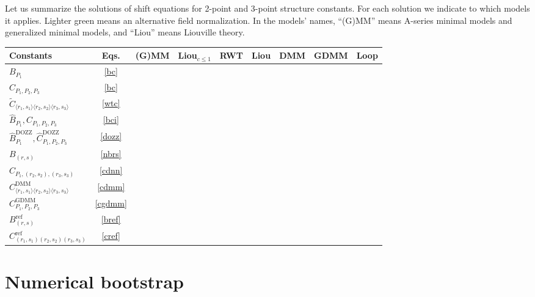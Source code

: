 \documentclass[12pt, a4paper]{article}
\begin{document}
Let us summarize the solutions of shift equations for 2-point and 3-point structure constants. For each solution we indicate to which models it applies. Lighter green means an alternative field normalization. In the models' names, ``(G)MM'' means A-series minimal models and generalized minimal models, and ``Liou'' means Liouville theory. 
\begin{center}
\begin{tabular}{|l|c|c|c|c|c|c|c|c|}
\hline 
 Constants & Eqs. & (G)MM & Liou$_{c\leq 1}$ & RWT & Liou & DMM & GDMM & Loop 
 \\
 \hline
  $B_{P_1}$ & \eqref{bc} & \cellcolor{green} & \cellcolor{green} & \cellcolor{green} &  & \cellcolor{green} & \cellcolor{green} & \cellcolor{green} 
  \\
  \hline 
  $C_{P_1,P_2,P_3}$& \eqref{bc} & \cellcolor{green} & \cellcolor{green} & \cellcolor{green} &  &  &  & \cellcolor{green} 
  \\
  \hline 
  $\widetilde{C}_{\langle r_1,s_1\rangle\langle r_2,s_2\rangle\langle r_3,s_3\rangle}$ & \eqref{wtc} & \cellcolor{green!20} & & & & & & 
  \\
  \hline 
  $\hat{B}_{P_1},\hat{C}_{P_1,P_2,P_3}$ &  \eqref{bci} & & & & \cellcolor{green} & & & 
  \\
  \hline 
  $\hat{B}^\text{DOZZ}_{P_1},\hat{C}^\text{DOZZ}_{P_1,P_2,P_3}$ & \eqref{dozz} & & & & \cellcolor{green!20} & & &
  \\
  \hline 
  $B_{(r,s)}$ & \eqref{nbrs} & & & & & \cellcolor{green} & \cellcolor{green} & 
  \\
  \hline 
  $C_{P_1,(r_2,s_2),(r_3,s_3)}$ & \eqref{cdnn} & & & & & \cellcolor{green} & \cellcolor{green} & 
  \\
  \hline 
  $C^\text{DMM}_{\langle r_1,s_1\rangle\langle r_2,s_2\rangle\langle r_3,s_3\rangle}$ & \eqref{cdmm} &
  & & & & \cellcolor{green} & & 
  \\
  \hline 
  $C^\text{GDMM}_{P_1,P_2,P_3}$ & \eqref{cgdmm} &
  & & & & & \cellcolor{green} & 
  \\
  \hline 
  $B^\text{ref}_{(r,s)}$ & \eqref{bref} & & & & & & & \cellcolor{green}
  \\
  \hline 
  $C^\text{ref}_{(r_1,s_1)(r_2,s_2)(r_3,s_3)}$ & \eqref{cref} & & & & & & & \cellcolor{green}
  \\
  \hline 
\end{tabular}
\end{center}

\section{Numerical bootstrap}
\end{document}
